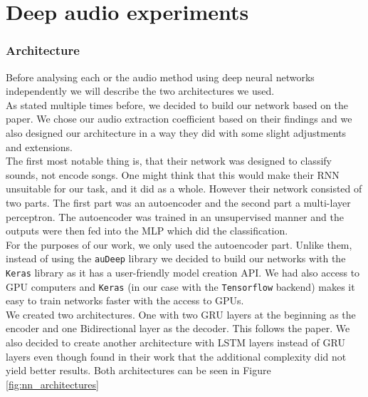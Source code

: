 \section{Deep audio experiments}

\subsubsection{Architecture}
Before analysing each or the audio method using deep neural networks independently we will describe the two architectures we used. \\

As stated multiple times before, we decided to build our network based on the \cite{inproceedings_RNNs} paper. We chose our audio extraction coefficient based on their findings and we also designed our architecture in a way they did with some slight adjustments and extensions. \\

The first most notable thing is, that their network was designed to classify sounds, not encode songs. One might think that this would make their RNN unsuitable for our task, and it did as a whole. However their network consisted of two parts. The first part was an autoencoder and the second part a multi-layer perceptron. The autoencoder was trained in an unsupervised manner and the outputs were then fed into the MLP which did the classification. \\

For the purposes of our work, we only used the autoencoder part. Unlike them, instead of using the \texttt{auDeep} library we decided to build our networks with the \texttt{Keras} library \cite{chollet2015keras} as it has a user-friendly model creation API. We had also access to GPU computers and \texttt{Keras} (in our case with the \texttt{Tensorflow} backend) makes it easy to train networks faster with the access to GPUs. \\

We created two architectures. One with two GRU layers at the beginning as the encoder and one Bidirectional layer as the decoder. This follows the paper. We also decided to create another architecture with LSTM layers instead of GRU layers even though \citeauthor{inproceedings_RNNs} found in their work that the additional complexity did not yield better results. Both architectures can be seen in Figure \ref{fig:nn_architectures} \\

